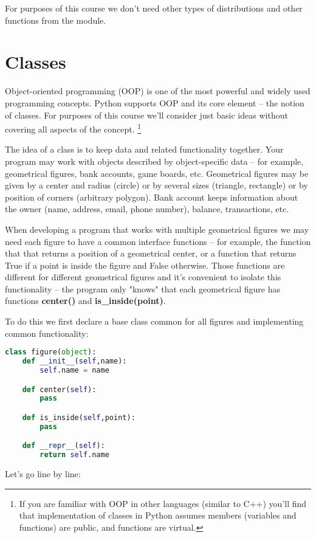 For purposes of this course we don't need other types of 
distributions and other functions from the module.

\section{Classes}

Object-oriented programming (OOP) is one of the most powerful
and widely used programming concepts. Python supports OOP and
its core element -- the notion of classes. For purposes of this
course we'll consider just basic ideas without covering all
aspects of the concept. \footnote{
If you are familiar with OOP in other languages (similar to C++)
you'll find that implementation of classes in Python
assumes members (variables and functions) are public,
and functions are virtual.}

The idea of a class is to keep data and related functionality
together. Your program may work with objects described
by object-specific data -- for example, geometrical figures,
bank accounts, game boards, etc. Geometrical figures may be
given by a center and radius (circle) or by several sizes
(triangle, rectangle) or by position of corners (arbitrary
polygon). Bank account keeps information about the owner
(name, address, email, phone number), balance, transactions, etc.

When developing a program that works with multiple geometrical
figures we may need each figure to have a common interface
functions -- for example, the function that that returns a
position of a geometrical center, or a function that returns True
if a point is inside the figure and False otherwise. Those functions
are different for different geometrical figures and it's convenient
to isolate this functionality -- the program only "knows" that
each geometrical figure has functions \textbf{center()} and
\textbf{is\_inside(point)}.

To do this we first declare a base class common for all figures
and implementing common functionality:

\begin{lstlisting}[language=Python,style=codelst2,caption={Python: base class}]
class figure(object):
    def __init__(self,name):
        self.name = name

    def center(self):
        pass

    def is_inside(self,point):
        pass

    def __repr__(self):
        return self.name
\end{lstlisting}
Let's go line by line:

